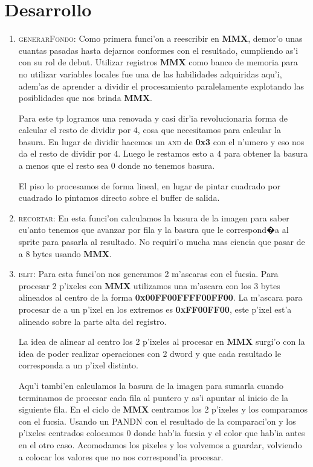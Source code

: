 \section{Desarrollo}

\begin{enumerate}
\item \textsc{generarFondo}:
Como primera funci'on a reescribir en \textbf{MMX}, demor'o unas cuantas pasadas hasta
dejarnos conformes con el resultado, cumpliendo as'i con su rol de debut.
Utilizar registros \textbf{MMX} como banco de memoria para no utilizar variables locales
fue una de las habilidades adquiridas aqu'i, adem'as de aprender a dividir el
procesamiento paralelamente explotando las posiblidades que nos brinda
\textbf{MMX}.

Para este tp logramos una renovada y casi dir'ia revolucionaria forma de
calcular el resto de dividir por $4$, cosa que necesitamos para calcular la
basura. En lugar de dividir hacemos un \textsc{and} de \textbf{0x3} con el
n'umero y eso nos da el resto de dividir por $4$. Luego le restamos esto a $4$
para obtener la basura a menos que el resto sea 0 donde no tenemos basura.

El piso lo procesamos de forma lineal, en lugar de pintar cuadrado por cuadrado
lo pintamos directo sobre el buffer de salida.

\item \textsc{recortar}:
En esta funci'on calculamos la basura de la imagen para saber cu'anto tenemos
que avanzar por fila y la basura que le correspond�a al sprite para pasarla al
resultado. No requiri'o mucha mas ciencia que pasar de a 8 bytes usando \textbf{MMX}.

\item \textsc{blit}:
Para esta funci'on nos generamos 2 m'ascaras con el fucsia. Para procesar 2
p'ixeles con \textbf{MMX} utilizamos una m'ascara con los 3 bytes alineados al
centro de la forma \textbf{0x00FF00FFFF00FF00}. La m'ascara para procesar de a
un p'ixel en los extremos es \textbf{0xFF00FF00}, este p'ixel est'a alineado
sobre la parte alta del registro.

La idea de alinear al centro los 2 p'ixeles al procesar en \textbf{MMX} surgi'o
con la idea de poder realizar operaciones con 2 dword y que cada resultado 
le corresponda a un p'ixel distinto. 

Aqu'i tambi'en calculamos la basura de la imagen para sumarla cuando terminamos
de procesar cada fila al puntero y as'i apuntar al inicio de la siguiente fila.
En el ciclo de \textbf{MMX} centramos los 2 p'ixeles y los comparamos con el fucsia.
Usando un \textsc{PANDN} con el resultado de la comparaci'on y los p'ixeles centrados
colocamos 0 donde hab'ia fucsia y el color que hab'ia antes en el otro caso.
Acomodamos los pixeles y los volvemos a guardar, volviendo a colocar los
valores que no nos correspond'ia procesar.


\end{enumerate}
